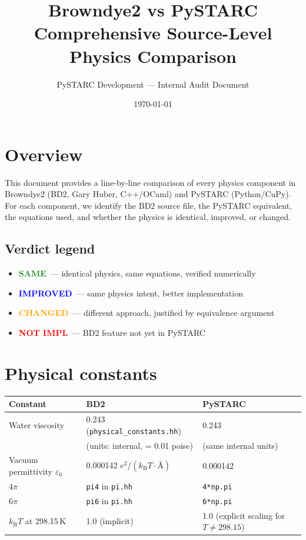 \documentclass[11pt]{article}
\title{\Large Browndye2 vs PySTARC\\[0.3em]
\large Comprehensive Source-Level Physics Comparison}
\author{PySTARC Development --- Internal Audit Document}
\date{\today}
\newcommand{\kBT}{k_{\mathrm{B}}T}
\newcommand{\same}{\textcolor{ForestGreen}{\textbf{SAME}}}
\newcommand{\improved}{\textcolor{Blue}{\textbf{IMPROVED}}}
\newcommand{\changed}{\textcolor{Orange}{\textbf{CHANGED}}}
\newcommand{\notimpl}{\textcolor{Red}{\textbf{NOT IMPL}}}
\begin{document}
\maketitle
\tableofcontents
\newpage

\section{Overview}

This document provides a line-by-line comparison of every physics
component in Browndye2 (BD2, Gary Huber, C++/OCaml) and PySTARC
(Python/CuPy). For each component, we identify the BD2 source file,
the PySTARC equivalent, the equations used, and whether the physics
is identical, improved, or changed.

\subsection{Verdict legend}
\begin{itemize}
\item \same\ --- identical physics, same equations, verified numerically
\item \improved\ --- same physics intent, better implementation
\item \changed\ --- different approach, justified by equivalence argument
\item \notimpl\ --- BD2 feature not yet in PySTARC
\end{itemize}


\section{Physical constants}

\begin{tabular}{lll}
\toprule
Constant & BD2 & PySTARC \\
\midrule
Water viscosity & 0.243 (\texttt{physical\_constants.hh}) & 0.243 \\
 & (units: internal, = 0.01 poise) & (same internal units) \\
Vacuum permittivity $\varepsilon_0$ & 0.000142 $e^2/(\kBT\cdot\text{\AA})$ & 0.000142 \\
$4\pi$ & \texttt{pi4} in \texttt{pi.hh} & \texttt{4*np.pi} \\
$6\pi$ & \texttt{pi6} in \texttt{pi.hh} & \texttt{6*np.pi} \\
$\kBT$ at 298.15\,K & 1.0 (implicit) & 1.0 (explicit scaling for $T \neq 298.15$) \\
\bottomrule
\end{tabular}
\end{document}
